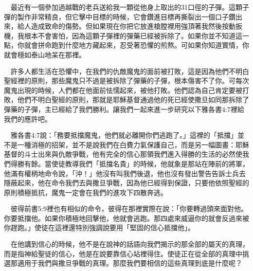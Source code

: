 \documentclass{book}
\begin{document}
\begin{center}
\noindent{}
\end{center}

　最近有一個參加過越戰的老兵送給我一顆從他身上取出的31口徑的子彈。這顆子彈的製作非常精良，但它擊中目標的時候，它會鑽進目標再撕裂出一個口子鑽出來，給人造成致命的傷勢。但如果現在你把它放進槍膛裡用強頂著我然後按動扳機，我根本不會害怕，因為這顆子彈裡的彈藥已經被拆除了。如果你並不知道這一點，你就會拼命跑到什麼地方藏起來，忍受著恐懼的煎熬。可如果你知道實情，你就會穩如泰山地呆在那裡。

　許多人都生活在恐懼中，在我們的仇敵魔鬼的面前被打敗，這是因為他們不明白聖經裡的原則，那些魔鬼只不過是被拆除了彈藥的子彈，根本傷害不了你。可每次魔鬼出現的時候，人們都在他面前怯懦起來，被他打敗。他們認為自己肯定要被打敗，他們不明白聖經的原則，那就是耶穌基督通過他的死已經使撒旦如同那拆除了彈藥的子彈，主已經給了我們勝利。讓我們一起來進一步研究以下雅各書4:7裡給我們的應許吧。

　雅各書4:7說：「務要抵擋魔鬼，他們就必離開你們逃跑了。」這裡的「抵擋」並不是一種消極的招架，並不是說我們在白費力氣保護自己，而是另一幅圖畫：耶穌基督的斗士出來與仇敵爭戰，他有完全的信心那領我們進入得勝的生活的必然使我們得勝有餘。當使徒教導我們「抵擋名貴」的時候，他就象是那站在陣前的將軍，他滿有權柄地命令說，「沖！」他沒有叫我們後退，他也沒有發出警告告訴士兵去隱蔽起來，他在命令我們去與撒旦爭戰，因為他已經得到保證，只要他依照聖經的原則積極抵抗，魔鬼一定會在我們的進攻下四散奔逃。

　彼得前書5:9裡也有相似的命令，彼得在那裡實際在說：「你要轉過頭來面對他。你要抵擋他。如果你積極地回擊他，他就會逃跑。那四處來威逼你的就會反過來被你趕跑。」使徒在這裡還特別強調說要用「堅固的信心抵擋他」。

　在他講到信心的時候，他不是在說神的話語向我們揭示的那全部的屬天的真理，而是指神給聖徒的信心，他是在說要靠信心站裡得住。使徒正在從全部的真理中挑選那適用于我們與撒旦爭戰的真理。那麼我們要相信的這些真理到底是什麼呢？
\end{document}
